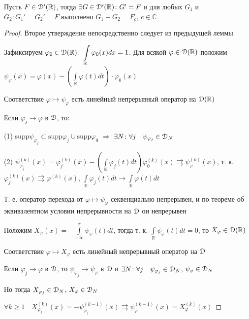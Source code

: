 \documentclass[a4paper,12pt]{report}
\begin{document}
\begin{thm}
Пусть $F\in\EuScript D'(\mathbb R)$, тогда $\exists G\in\EuScript D'(\mathbb R)\colon G'=F$ и для любых $G_1$ и $G_2\colon G_1'=G_2'=F$ выполнено $G_1-G_2=F_c$, $c\in\mathbb C$
\end{thm}
\begin{proof}
Второе утверждение непосредственно следует из предыдущей леммы

Зафиксируем $\varphi_0\in\EuScript D(\mathbb R)\colon\displaystyle\int\limits_{\mathbb R}\varphi_0(x)dx=1$. Для всякой $\varphi\in\EuScript D(\mathbb R)$ положим $\psi_\varphi(x)=\varphi(x)-\left(\displaystyle\int\limits_{\mathbb R}\varphi(t)dt\right)\cdot\varphi_0(x)$

Соответствие $\varphi\mapsto\psi_\varphi$ есть линейный непрерывный оператор на $\EuScript D(\mathbb R)$

Если $\varphi_j\to\varphi$ в $\EuScript D$, то:

(1) $\mathrm{supp}\psi_{\varphi_j}\subset\mathrm{supp}\varphi_j\cup\mathrm{supp}\varphi_0$ $\Rightarrow$ $\exists N\colon\forall j\quad\psi_{\varphi_j}\in\EuScript D_N$

(2) $\psi_{\varphi_j}^{(k)}(x)=\varphi_j^{(k)}(x)-\left(\displaystyle\int\limits_{\mathbb R}\varphi_j(t)dt\right)\varphi_0^{(k)}(x)\rightrightarrows\psi_{\varphi}^{(k)}(x)$, т. к. \\$\varphi_j^{(k)}(x)\rightrightarrows\varphi^{(k)}(x)$, $\displaystyle\int\limits_{\mathbb R}\varphi_j(t)dt\to\displaystyle\int\limits_{\mathbb R}\varphi(t)dt$

Т. е. оператор перехода от $\varphi\mapsto\psi_\varphi$ секвенциально непрерывен, и по теореме об эквивалентном условии непрерывности на $\EuScript D$ он непрерывен

Положим $X_\varphi(x)=-\displaystyle\int\limits_{-\infty}^x\psi_\varphi(t)dt$, тогда т. к. $\displaystyle\int\limits_{\mathbb R}\psi_\varphi(t)dt=0$, то $X_\varphi\in\EuScript D(\mathbb R)$

Соответствие $\varphi\mapsto X_\varphi$ есть линейный непрерывный оператор на $\EuScript D$

Если $\varphi_j\to\varphi$ в $\EuScript D$, то $\psi_{\varphi_j}\to\psi_\varphi$ в $\EuScript D$ и $\exists N\colon\forall j\quad\psi_{\varphi_j}\in\EuScript D_N$, $\psi_\varphi\in\EuScript D_N$

Но тогда $X_{\varphi_j}\in\EuScript D_N$, $X_\varphi\in\EuScript D_N$

$\forall k\ge1\quad X_{\varphi_j}^{(k)}(x)=-\psi_{\varphi_j}^{(k-1)}(x)\rightrightarrows\psi_\varphi^{(k-1)}(x)=X_\varphi^{(k)}(x)$


\end{proof}
\end{document}

